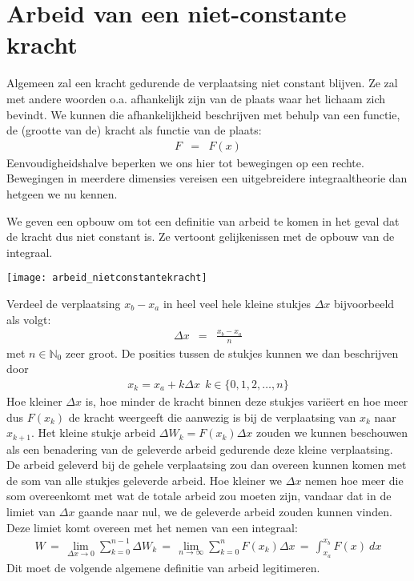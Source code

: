 \documentclass{ximera}
\begin{document}
	\author{Bart Lambregs}
    \xmsource





	\section{Arbeid van een niet-constante kracht}

	Algemeen zal een kracht gedurende de verplaatsing niet constant blijven. Ze zal met andere woorden o.a. afhankelijk zijn van de plaats waar het lichaam zich bevindt. We kunnen die afhankelijkheid beschrijven met behulp van een functie, de (grootte van de) kracht
	als functie van de plaats:
	\begin{eqnarray*}
	F&=&F(x)
	\end{eqnarray*}
	Eenvoudigheidshalve beperken we ons hier tot bewegingen op een rechte. Bewegingen in meerdere dimensies vereisen een uitgebreidere integraaltheorie dan hetgeen we nu kennen.
	
	We geven een opbouw om tot een definitie van arbeid te komen in het geval dat de kracht dus niet constant is. Ze vertoont gelijkenissen met de opbouw van de integraal.
	\begin{image}
	
	\texttt{[image: arbeid\_nietconstantekracht]}
	\end{image}
	
	Verdeel de verplaatsing $x_b-x_a$ in heel veel hele kleine stukjes $\Delta x$ bijvoorbeeld als volgt:
	\begin{eqnarray*}
	\Delta x&=&\frac{x_b-x_a}{n}
	\end{eqnarray*}
	met $n\in\mathbb{N}_0$ zeer groot. De posities tussen de stukjes kunnen we dan be\-schrij\-ven door
	\begin{eqnarray*}
	x_k=x_a+k\Delta x\ \ k\in\{0,1,2,\ldots,n\}
	\end{eqnarray*}
	Hoe kleiner $\Delta x$ is, hoe minder de kracht binnen deze stukjes vari\"eert en hoe meer dus $F(x_k)$ de kracht weergeeft die aanwezig is bij de verplaatsing van $x_{k}$ naar $x_{k+1}$. Het kleine stukje arbeid $\Delta W_k=F(x_k)\Delta x$ zouden we kunnen beschouwen als
	een benadering van de geleverde arbeid gedurende deze kleine verplaatsing. De arbeid geleverd bij de gehele verplaatsing zou dan overeen kunnen komen met de som van alle stukjes geleverde arbeid. Hoe kleiner we $\Delta x$ nemen hoe meer die som overeenkomt met wat de totale arbeid zou moeten zijn, vandaar dat in de limiet van $\Delta x$ gaande naar nul, we de geleverde arbeid zouden kunnen vinden. Deze limiet komt overeen met het nemen van een integraal:
	\begin{eqnarray*}
	W\,=\,\lim_{\Delta x\rightarrow0}\sum_{k=0}^{n-1}\Delta W_k
	\,=\,\lim_{n\rightarrow\infty}\sum_{k=0}^{n}F(x_k)\Delta x
	\,=\,\int_{x_a}^{x_b}F(x)~dx
	\end{eqnarray*}
	Dit moet de volgende algemene definitie van arbeid legitimeren.
	
\end{document}
